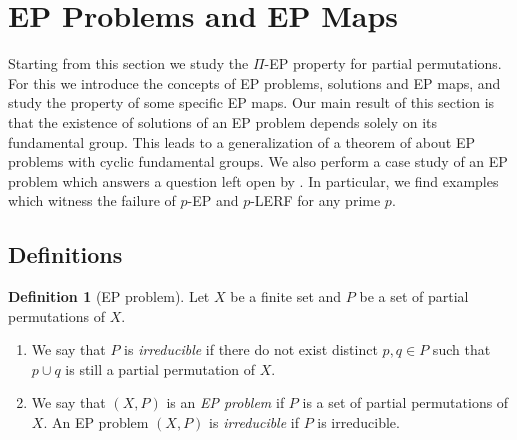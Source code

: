 \documentclass[10pt,a4paper]{amsart}
\theoremstyle{definition}
\newtheorem{definition}[theorem]{Definition}
\theoremstyle{definition}
\numberwithin{equation}{section}
\begin{document}





























































\section{EP Problems and EP Maps}

Starting from this section we study the $\Pi$-EP property for partial permutations. For this we introduce the concepts of EP problems, solutions and EP maps,  and study the property of some specific EP maps. Our main result of this section is that the existence of solutions of an EP problem depends solely on its fundamental group. This leads to a generalization of a theorem of \cite{HPSW19} about EP problems with cyclic fundamental groups. We also perform a case study of an EP problem which answers a question left open by \cite{HPSW19}. In particular, we find examples which witness the failure of $p$-EP and $p$-LERF for any prime $p$.

\subsection{Definitions\label{subsec:EPproblem}}

\begin{definition}[EP problem]\label{def:EPproblem} Let $X$ be a finite set and $P$ be a set of partial permutations of $X$.
\begin{enumerate}
\item[(1)] We say that $P$ is {\em irreducible} if there do not exist distinct $p, q\in P$ such that $p\cup q$ is still a partial permutation of $X$.
\item[(2)] We say that $(X, P)$ is an {\em EP problem} if $P$ is a set of partial permutations of $X$. An EP problem $(X, P)$ is {\em irreducible} if $P$ is irreducible.
\end{enumerate}
\end{definition}
\end{document}

